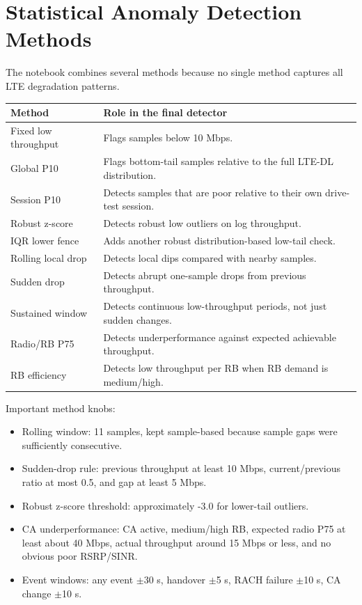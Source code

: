 \documentclass[12pt,a4paper]{article}
\begin{document}
\section{Statistical Anomaly Detection Methods}

The notebook combines several methods because no single method captures all LTE degradation patterns.

\begin{center}
\begin{tabularx}{\textwidth}{L{0.28\textwidth}Y}
\toprule
\textbf{Method} & \textbf{Role in the final detector} \\
\midrule
Fixed low throughput & Flags samples below 10 Mbps. \\
Global P10 & Flags bottom-tail samples relative to the full LTE-DL distribution. \\
Session P10 & Detects samples that are poor relative to their own drive-test session. \\
Robust z-score & Detects robust low outliers on log throughput. \\
IQR lower fence & Adds another robust distribution-based low-tail check. \\
Rolling local drop & Detects local dips compared with nearby samples. \\
Sudden drop & Detects abrupt one-sample drops from previous throughput. \\
Sustained window & Detects continuous low-throughput periods, not just sudden changes. \\
Radio/RB P75 & Detects underperformance against expected achievable throughput. \\
RB efficiency & Detects low throughput per RB when RB demand is medium/high. \\
\bottomrule
\end{tabularx}
\end{center}

Important method knobs:
\begin{itemize}
    \item Rolling window: 11 samples, kept sample-based because sample gaps were sufficiently consecutive.
    \item Sudden-drop rule: previous throughput at least 10 Mbps, current/previous ratio at most 0.5, and gap at least 5 Mbps.
    \item Robust z-score threshold: approximately -3.0 for lower-tail outliers.
    \item CA underperformance: CA active, medium/high RB, expected radio P75 at least about 40 Mbps, actual throughput around 15 Mbps or less, and no obvious poor RSRP/SINR.
    \item Event windows: any event $\pm$30 s, handover $\pm$5 s, RACH failure $\pm$10 s, CA change $\pm$10 s.
\end{itemize}
\end{document}
